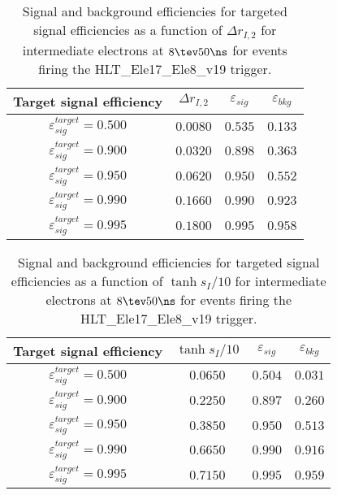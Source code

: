 \clearpage

\begin{table}[!bht]
  \begin{center}
    \begin{tabular}{cccc}
      \hline
      Target signal efficiency & $\Delta r_{I,2}$ & $\varepsilon_{sig}$ & $\varepsilon_{bkg}$ \\ 
      \hline
      $\varepsilon_{sig}^{target} = 0.500$ & $  0.0080$ & $0.535$ & $0.133$ \\
      $\varepsilon_{sig}^{target} = 0.900$ & $  0.0320$ & $0.898$ & $0.363$ \\
      $\varepsilon_{sig}^{target} = 0.950$ & $  0.0620$ & $0.950$ & $0.552$ \\
      $\varepsilon_{sig}^{target} = 0.990$ & $  0.1660$ & $0.990$ & $0.923$ \\
      $\varepsilon_{sig}^{target} = 0.995$ & $  0.1800$ & $0.995$ & $0.958$ \\
      \hline
    \end{tabular}
    \caption{Signal and background efficiencies for targeted signal efficiencies as a function of $\Delta r_{I,2}$ for intermediate electrons at $8\tev 50\ns$ for events firing the HLT\_Ele17\_Ele8\_v19 trigger.}
    \label{tab:eff_rej_r2I_beam_8_50_trigger_17_8_I}
  \end{center}
\end{table}

\clearpage

\begin{table}[!bht]
  \begin{center}
    \begin{tabular}{cccc}
      \hline
      Target signal efficiency & $\tanh{s_I/10}$ & $\varepsilon_{sig}$ & $\varepsilon_{bkg}$ \\ 
      \hline
      $\varepsilon_{sig}^{target} = 0.500$ & $  0.0650$ & $0.504$ & $0.031$ \\
      $\varepsilon_{sig}^{target} = 0.900$ & $  0.2250$ & $0.897$ & $0.260$ \\
      $\varepsilon_{sig}^{target} = 0.950$ & $  0.3850$ & $0.950$ & $0.513$ \\
      $\varepsilon_{sig}^{target} = 0.990$ & $  0.6650$ & $0.990$ & $0.916$ \\
      $\varepsilon_{sig}^{target} = 0.995$ & $  0.7150$ & $0.995$ & $0.959$ \\
      \hline
    \end{tabular}
    \caption{Signal and background efficiencies for targeted signal efficiencies as a function of $\tanh{s_I/10}$ for intermediate electrons at $8\tev 50\ns$ for events firing the HLT\_Ele17\_Ele8\_v19 trigger.}
    \label{tab:eff_rej_sI_beam_8_50_trigger_17_8_I}
  \end{center}
\end{table}

